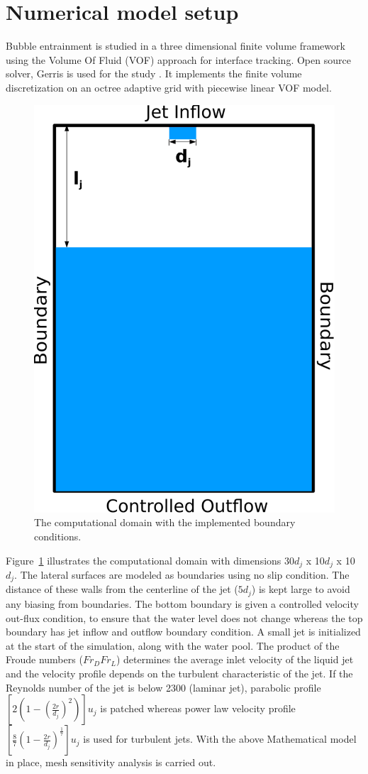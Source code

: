 \section{Numerical model setup}
Bubble entrainment is studied in a three dimensional finite volume framework using the Volume Of Fluid (VOF) approach for interface tracking. Open source solver, Gerris is used for the study \citep{Popinet2003}. It implements the finite volume discretization on an octree adaptive grid with piecewise linear VOF model. 
\begin{figure}
	\centering
	\includegraphics[width=0.5\linewidth]{chapters/jetPool/Figure3}
	\caption{The computational domain with the implemented boundary conditions.}
	\label{Figure::domain}
\end{figure}
Figure~\ref{Figure::domain} illustrates the computational domain with dimensions 30$d_j$ x 10$d_j$ x 10$d_j$. The lateral surfaces are modeled as boundaries using no slip condition. The distance of these walls from the centerline of the jet ($5d_j$) is kept large to avoid any biasing from boundaries. The bottom boundary is given a controlled velocity out-flux condition, to ensure that the water level does not change whereas the top boundary has jet inflow and outflow boundary condition. A small jet is initialized at the start of the simulation, along with the water pool. The product of the Froude numbers ($Fr_DFr_L$) determines the average inlet velocity of the liquid jet and the velocity profile depends on the turbulent characteristic of the jet. If the Reynolds number of the jet is below 2300 (laminar jet), parabolic profile $\left[2\left(1 - \left(\frac{2r}{d_j}\right)^2\right) \right]u_j$ is patched whereas power law velocity profile $\left[\frac{8}{7}\left(1 - \frac{2r}{d_j}\right)^{\frac{1}{7}} \right]u_j$ is used for turbulent jets. With the above Mathematical model in place, mesh sensitivity analysis is carried out.\\
